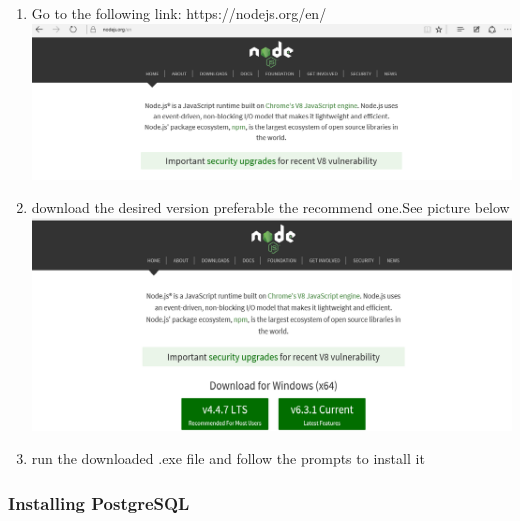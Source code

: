 \documentclass[a4paper,12pt]{article}
\begin{document}
\begin{enumerate}
\item Go to the following link: https://nodejs.org/en/\\[0.2cm]
\includegraphics[width=0.9\linewidth, center]{./Installation/nodejs_website.PNG}\\[0.4cm] 
 
\item download the desired version preferable the recommend one.See picture below \\
\includegraphics[width=0.9\linewidth, center]{./Installation/nodejs.PNG}\\[0.4cm] 
 
\item run the downloaded .exe file and follow the prompts to install it\\
\end{enumerate}
\subsubsection{Installing PostgreSQL}
\end{document}
